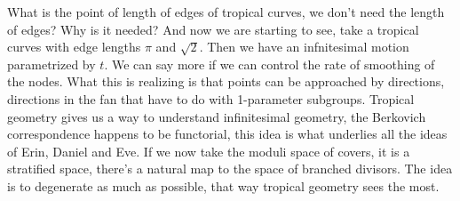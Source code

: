 \documentclass[12pt]{memoir}
\begin{document}
What is the point of length of edges of tropical curves, we don't need the length of edges? Why is it needed? And now we are starting to see, take a tropical curves with edge lengths $\pi$ and $\sqrt{2}$. Then we have an infnitesimal motion parametrized by $t$. We can say more if we can control the rate of smoothing of the nodes. What this is realizing is that points can be approached by directions, directions in the fan that have to do with 1-parameter subgroups. Tropical geometry gives us a way to understand infinitesimal geometry, the Berkovich correspondence happens to be functorial, this idea is what underlies all the ideas of Erin, Daniel and Eve. If we now take the moduli space of covers, it is a stratified space, there's a natural map to the space of branched divisors. The idea is to degenerate as much as possible, that way tropical geometry sees the most. 

\ifx\nextra\undefined
\printindex
\else\fi
\nocite{*}


\end{document}
